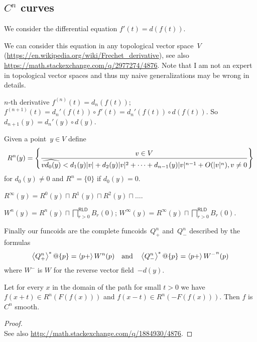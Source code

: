 \subsection{$C^n$ curves}

We consider the differential equation $f'(t) = d(f(t))$.

We can consider this equation in any topological vector
space~$V$ (\url{https://en.wikipedia.org/wiki/Frechet_derivative}), see also
\url{https://math.stackexchange.com/q/2977274/4876}.
Note that I am not an expert in topological vector spaces
and thus my naive generalizations may be wrong in details.

$n$-th derivative $f^{(n)}(t)=d_n(f(t))$;
$f^{(n+1)}(t)=d_n'(f(t))\circ f'(t)=d_n'(f(t))\circ d(f(t))$.
So $d_{n+1}(y)=d_n'(y)\circ d(y)$.

Given a point~$y\in V$
define \[R^n(y) = \left\{ \frac{v\in V}{\widehat{vd_0(y)}<
d_1(y)|v|+d_2(y)|v|^2+\dots+d_{n-1}(y)|v|^{n-1}+O(|v|^n), v\ne 0}\right\}\] for $d_0(y)\ne 0$ and $R^n = \{0\}$ if $d_0(y)=0$.

\begin{defn}
$R^\infty(y) = R^0(y)\sqcap R^1(y)\sqcap R^2(y)\sqcap\dots$.
\end{defn}


\begin{defn}
$W^n(y) = R^n(y) \sqcap \bigsqcap^{\mathsf{RLD}}_{r>0}B_r(0)$;
$W^\infty(y) = R^\infty(y) \sqcap \bigsqcap^{\mathsf{RLD}}_{r>0}B_r(0)$.
\end{defn}

Finally our funcoids are the complete funcoids~$Q_+^n$ and~$Q_-^n$ described by the formulas
\[
\left\langle Q_+^n\right\rangle ^{\ast}@\{p\} = \left\langle p+\right\rangle W^n(p) \quad\text{and}\quad \left\langle Q_-^n\right\rangle ^{\ast}@\{p\} = \left\langle p+\right\rangle {W^-}^n(p)
\]
where $W^-$ is $W$ for the reverse vector field~$-d(y)$.


\begin{lem}
Let for every $x$ in the domain of the path for small $t > 0$ we have $f (x + t) \in R^n (F (f (x)))$ and $f (x - t) \in R^n (- F (f (x)))$.
Then $f$ is $C^n$ smooth.
\end{lem}

\begin{proof}
\\
See also \url{http://math.stackexchange.com/q/1884930/4876}.
\end{proof}

